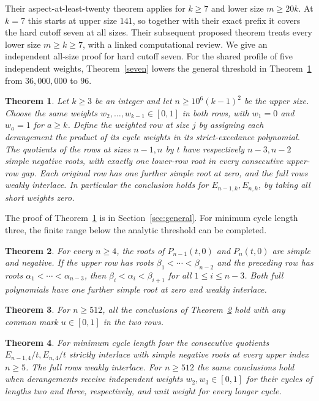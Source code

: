 \documentclass[11pt]{article}
\newtheorem{theorem}{Theorem}
\begin{document}
Their aspect-at-least-twenty theorem \cite{programcomputer8} applies for \(k\ge7\) and lower size \(m\ge20k\). At \(k=7\) this starts at upper size \(141\), so together with their exact prefix it covers the hard cutoff seven at all sizes. Their subsequent proposed theorem \cite{programcomputer9} treats every lower size \(m\ge k\ge7\), with a linked computational review. We give an independent all-size proof for hard cutoff seven. For the shared profile of five independent weights, Theorem~\ref{seven} lowers the general threshold in Theorem~\ref{general} from \(36{,}000{,}000\) to \(96\).
\begin{theorem}\label{general}
Let \(k\ge3\) be an integer and let \(n\ge10^6(k-1)^2\) be the upper size. Choose the same weights \(w_2,\ldots,w_{k-1}\in[0,1]\) in both rows, with \(w_1=0\) and \(w_a=1\) for \(a\ge k\). Define the weighted row at size \(j\) by assigning each derangement the product of its cycle weights in its strict-excedance polynomial. The quotients of the rows at sizes \(n-1,n\) by \(t\) have respectively \(n-3,n-2\) simple negative roots, with exactly one lower-row root in every consecutive upper-row gap. Each original row has one further simple root at zero, and the full rows weakly interlace. In particular the conclusion holds for \(E_{n-1,k},E_{n,k}\), by taking all short weights zero.
\end{theorem}
The proof of Theorem~\ref{general} is in Section~\ref{sec:general}. For minimum cycle length three, the finite range below the analytic threshold can be completed.
\begin{theorem}\label{main}
For every \(n\ge4\), the roots of \(P_{n-1}(t,0)\) and \(P_n(t,0)\) are simple and negative. If the upper row has roots \(\beta_1<\cdots<\beta_{n-2}\) and the preceding row has roots \(\alpha_1<\cdots<\alpha_{n-3}\), then \(\beta_i<\alpha_i<\beta_{i+1}\) for all \(1\le i\le n-3\). Both full polynomials have one further simple root at zero and weakly interlace.
\end{theorem}
\begin{theorem}\label{family}
For \(n\ge512\), all the conclusions of Theorem~\ref{main} hold with any common mark \(u\in[0,1]\) in the two rows.
\end{theorem}
\begin{theorem}\label{four}
For minimum cycle length four the consecutive quotients \(E_{n-1,4}/t,E_{n,4}/t\) strictly interlace with simple negative roots at every upper index \(n\ge5\). The full rows weakly interlace. For \(n\ge512\) the same conclusions hold when derangements receive independent weights \(w_2,w_3\in[0,1]\) for their cycles of lengths two and three, respectively, and unit weight for every longer cycle.
\end{theorem}
\end{document}
